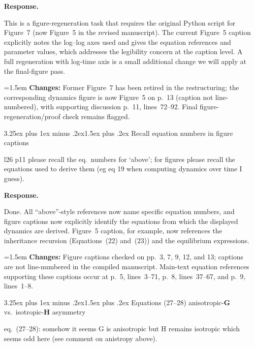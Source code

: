 \documentclass[11pt,a4paper]{article}
\makeatletter
\newcommand{\response}{%
  \par\medskip\noindent\textbf{\color{ResponseColor}Response.}\quad\ignorespaces
}
\newcommand{\changesat}[1]{%
  \par\smallskip\noindent\hangindent=1.5em\hangafter=1
  \textbf{\color{ChangeColor}Changes:} \quad #1\par\medskip
}
\renewcommand{\subsection}{\@startsection{subsection}{2}{0pt}%
  {3.25ex plus 1ex minus .2ex}{1.5ex plus .2ex}%
  {\large\bfseries}}
\newcommand{\mat}[1]{\ensuremath{\mathbf{#1}}}
\makeatother
\begin{document}
\response
This is a figure-regeneration task that requires the original Python script for Figure~7 (now Figure~5 in the revised manuscript). The current Figure~5 caption explicitly notes the log--log axes used and gives the equation references and parameter values, which addresses the legibility concern at the caption level. A full regeneration with log-time axis is a small additional change we will apply at the final-figure pass.

\changesat{Former Figure~7 has been retired in the restructuring; the corresponding dynamics figure is now Figure~5 on p.~13 (caption not line-numbered), with supporting discussion p.~11, lines~72--92. Final figure-regeneration/proof check remains flagged.}

\subsection{Recall equation numbers in figure captions}

\begin{edquote}
l26 p11 please recall the eq.\ numbers for ‘above’; for figures please recall the equations used to derive them (eg eq 19 when computing dynamics over time I guess).
\end{edquote}

\response
Done. All ``above''-style references now name specific equation numbers, and figure captions now explicitly identify the equations from which the displayed dynamics are derived. Figure~5 caption, for example, now references the inheritance recursion (Equations~(22) and~(23)) and the equilibrium expressions.

\changesat{Figure captions checked on pp.~3, 7, 9, 12, and 13; captions are not line-numbered in the compiled manuscript. Main-text equation references supporting these captions occur at p.~5, lines~3--71, p.~8, lines~37--67, and p.~9, lines~1--8.}

\subsection{\texorpdfstring{Equations (27--28) anisotropic-$\mat{G}$ vs.\ isotropic-$\mat{H}$ asymmetry}{Equations (27-28) anisotropic-G vs. isotropic-H asymmetry}}

\begin{edquote}
eq.\ (27--28): somehow it seems G is anisotropic but H remains isotropic which seems odd here (see comment on anistropy above).
\end{edquote}
\end{document}
